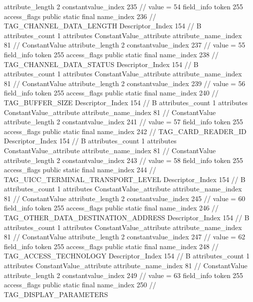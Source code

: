 {{{{{{{					attribute_length	2
					constantvalue_index	235		// value = 54
				}
				}
			}
			field_info {
				token	255
				access_flags	public static final
				name_index	236		// TAG_CHANNEL_DATA_LENGTH
				Descriptor_Index	154		// B
				attributes_count	1
				attributes {
				ConstantValue_attribute {
					attribute_name_index	81		// ConstantValue
					attribute_length	2
					constantvalue_index	237		// value = 55
				}
				}
			}
			field_info {
				token	255
				access_flags	public static final
				name_index	238		// TAG_CHANNEL_DATA_STATUS
				Descriptor_Index	154		// B
				attributes_count	1
				attributes {
				ConstantValue_attribute {
					attribute_name_index	81		// ConstantValue
					attribute_length	2
					constantvalue_index	239		// value = 56
				}
				}
			}
			field_info {
				token	255
				access_flags	public static final
				name_index	240		// TAG_BUFFER_SIZE
				Descriptor_Index	154		// B
				attributes_count	1
				attributes {
				ConstantValue_attribute {
					attribute_name_index	81		// ConstantValue
					attribute_length	2
					constantvalue_index	241		// value = 57
				}
				}
			}
			field_info {
				token	255
				access_flags	public static final
				name_index	242		// TAG_CARD_READER_ID
				Descriptor_Index	154		// B
				attributes_count	1
				attributes {
				ConstantValue_attribute {
					attribute_name_index	81		// ConstantValue
					attribute_length	2
					constantvalue_index	243		// value = 58
				}
				}
			}
			field_info {
				token	255
				access_flags	public static final
				name_index	244		// TAG_UICC_TERMINAL_TRANSPORT_LEVEL
				Descriptor_Index	154		// B
				attributes_count	1
				attributes {
				ConstantValue_attribute {
					attribute_name_index	81		// ConstantValue
					attribute_length	2
					constantvalue_index	245		// value = 60
				}
				}
			}
			field_info {
				token	255
				access_flags	public static final
				name_index	246		// TAG_OTHER_DATA_DESTINATION_ADDRESS
				Descriptor_Index	154		// B
				attributes_count	1
				attributes {
				ConstantValue_attribute {
					attribute_name_index	81		// ConstantValue
					attribute_length	2
					constantvalue_index	247		// value = 62
				}
				}
			}
			field_info {
				token	255
				access_flags	public static final
				name_index	248		// TAG_ACCESS_TECHNOLOGY
				Descriptor_Index	154		// B
				attributes_count	1
				attributes {
				ConstantValue_attribute {
					attribute_name_index	81		// ConstantValue
					attribute_length	2
					constantvalue_index	249		// value = 63
				}
				}
			}
			field_info {
				token	255
				access_flags	public static final
				name_index	250		// TAG_DISPLAY_PARAMETERS
}}}}}
